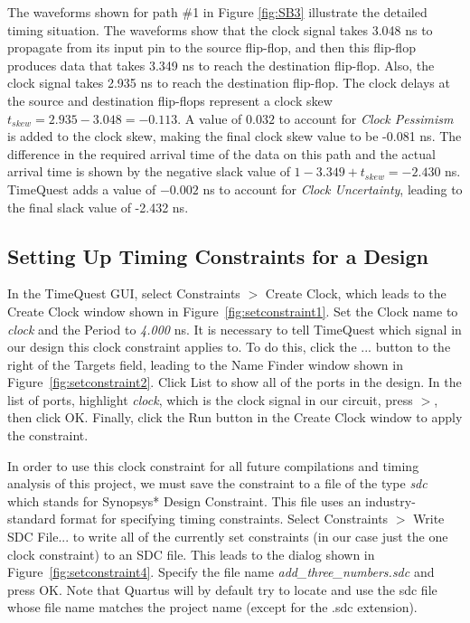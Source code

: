 \documentclass[11pt, twoside, pdftex]{article}
\begin{document}
The waveforms shown for path \#1 in Figure \ref{fig:SB3} illustrate the detailed timing
situation. The waveforms show that the clock signal takes 3.048 ns to propagate from its
input pin to the source flip-flop, and then this flip-flop produces data that takes 3.349 ns to reach the
destination flip-flop. Also, the clock signal takes 2.935 ns to reach the destination
flip-flop. The clock delays at the source and destination flip-flops
represent a clock skew $t_{skew} = 2.935 - 3.048 = -0.113$. A value of $0.032$
to account for {\it Clock Pessimism} is added to the clock skew, 
making the final clock skew value to be -0.081 ns.
The difference in the required arrival time of the data on this path and the
actual arrival time is shown by the negative slack value of 
$1 - 3.349 + t_{skew} = -2.430$ ns. TimeQuest adds a value of $-0.002$ ns to account for 
{\it Clock Uncertainty}, leading to the final slack value of -2.432 ns.

\subsection{Setting Up Timing Constraints for a Design}
In the TimeQuest GUI, select {\sf Constraints $>$ Create Clock}, which leads to the
Create Clock window shown in Figure~\ref{fig:setconstraint1}. Set the Clock name to
{\it clock} and the Period to {\it 4.000} ns. It is necessary to tell TimeQuest which signal in
our design this clock constraint applies to. To do this, click the {\sf ...} button to the right of 
the {\sf Targets} field, leading to the Name Finder window shown in Figure~\ref{fig:setconstraint2}.
Click {\sf List} to show all of the ports in the design. In the list of ports, highlight {\it clock}, which is the
clock signal in our circuit, press {\sf $>$}, then click {\sf OK}. Finally, click the {\sf Run}
button in the Create Clock window to apply the constraint.

In order to use this clock constraint for all future compilations and timing 
analysis of this project, we must save the constraint to a file of the type
{\it sdc} which stands for {\sf Synopsys* Design Constraint}. This file uses an industry-standard
format for specifying timing constraints. Select {\sf Constraints $>$ Write SDC File...} to write
all of the currently set constraints (in our case just the one clock constraint) to an SDC file.
This leads to the dialog shown in Figure~\ref{fig:setconstraint4}. Specify the file name {\it add\_three\_numbers.sdc}
and press {\sf OK}. Note that Quartus will by default try to locate and use the sdc file whose file name
matches the project name (except for the .sdc extension).
\end{document}
